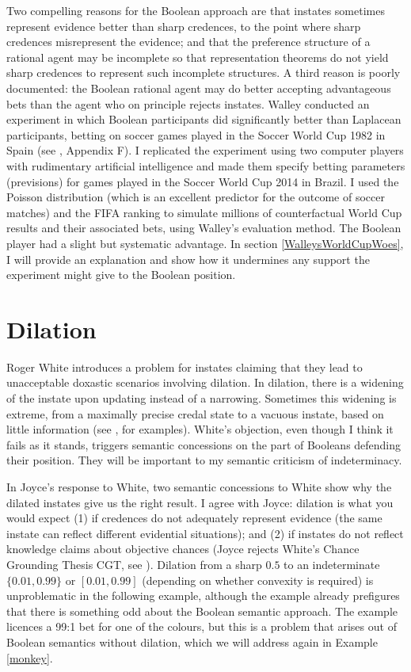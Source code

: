 Two compelling reasons for the Boolean approach are
that instates sometimes represent evidence better than
sharp credences, to the point where sharp credences
misrepresent the evidence; and that the preference
structure of a rational agent may be incomplete so that
representation theorems do not yield sharp credences to
represent such incomplete structures. A third reason is
poorly documented: the Boolean rational agent may do
better accepting advantageous bets than the agent who
on principle rejects instates. Walley conducted an
experiment in which Boolean participants did
significantly better than Laplacean participants,
betting on soccer games played in the Soccer World Cup
1982 in Spain (see , Appendix
F). I replicated the experiment
using two computer players with rudimentary artificial
intelligence and made them specify betting parameters
(previsions) for games played in the Soccer World Cup
2014 in Brazil. I used the Poisson distribution (which
is an excellent predictor for the outcome of soccer
matches) and the FIFA ranking to simulate millions of
counterfactual World Cup results and their associated
bets, using Walley's evaluation method. The Boolean
player had a slight but systematic advantage. In
section \ref{WalleysWorldCupWoes}, I will provide an
explanation and show how it undermines any support the
experiment might give to the Boolean position.

\section{Dilation}
\label{Dilation}

Roger White introduces a problem for instates claiming
that they lead to unacceptable doxastic scenarios
involving dilation. In dilation, there is a widening of
the instate upon updating instead of a narrowing.
Sometimes this widening is extreme, from a maximally
precise credal state to a vacuous instate, based on
little information (see , for
examples). White's objection, even though I think it
fails as it stands, triggers semantic concessions on
the part of Booleans defending their position. They
will be important to my semantic criticism of
indeterminacy.

In Joyce's response to White, two semantic concessions
to White show why the dilated instates give us the
right result. I agree with Joyce: dilation is what you
would expect (1) if credences do not adequately
represent evidence (the same instate can reflect
different evidential situations); and (2) if instates
do not reflect knowledge claims about objective chances
(Joyce rejects White's Chance Grounding Thesis CGT, see
). Dilation from a sharp $0.5$
to an indeterminate $\{0.01,0.99\}$ or $[0.01,0.99]$
(depending on whether convexity is required) is
unproblematic in the following example, although the
example already prefigures that there is something odd
about the Boolean semantic approach. The example
licences a 99:1 bet for one of the colours, but this is
a problem that arises out of Boolean semantics without
dilation, which we will address again in Example
\ref{monkey}.

